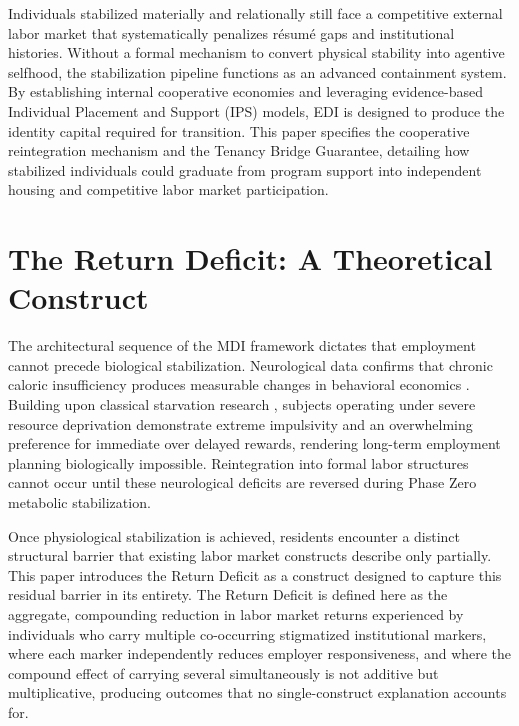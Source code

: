 \documentclass[12pt, letterpaper]{article}
\begin{document}
Individuals stabilized materially and relationally still face a competitive external labor market that systematically penalizes r\'{e}sum\'{e} gaps and institutional histories. Without a formal mechanism to convert physical stability into agentive selfhood, the stabilization pipeline functions as an advanced containment system. By establishing internal cooperative economies and leveraging evidence-based Individual Placement and Support (IPS) models, EDI is designed to produce the identity capital required for transition. This paper specifies the cooperative reintegration mechanism and the Tenancy Bridge Guarantee, detailing how stabilized individuals could graduate from program support into independent housing and competitive labor market participation.

\section{The Return Deficit: A Theoretical Construct}

The architectural sequence of the MDI framework dictates that employment cannot precede biological stabilization. Neurological data confirms that chronic caloric insufficiency produces measurable changes in behavioral economics \cite{mullainathan2013scarcity}. Building upon classical starvation research \cite{keys1950biology}, subjects operating under severe resource deprivation demonstrate extreme impulsivity and an overwhelming preference for immediate over delayed rewards, rendering long-term employment planning biologically impossible. Reintegration into formal labor structures cannot occur until these neurological deficits are reversed during Phase Zero metabolic stabilization.

Once physiological stabilization is achieved, residents encounter a distinct structural barrier that existing labor market constructs describe only partially. This paper introduces the Return Deficit as a construct designed to capture this residual barrier in its entirety. The Return Deficit is defined here as the aggregate, compounding reduction in labor market returns experienced by individuals who carry multiple co-occurring stigmatized institutional markers, where each marker independently reduces employer responsiveness, and where the compound effect of carrying several simultaneously is not additive but multiplicative, producing outcomes that no single-construct explanation accounts for.
\end{document}
